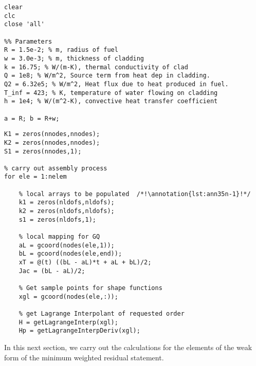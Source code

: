 \begin{lstlisting}[style=myMatlab,name=lec35n-ex]
clear
clc
close 'all'

%% Parameters
R = 1.5e-2; % m, radius of fuel
w = 3.0e-3; % m, thickness of cladding
k = 16.75; % W/(m-K), thermal conductivity of clad
Q = 1e8; % W/m^2, Source term from heat dep in cladding.
Q2 = 6.32e5; % W/m^2, Heat flux due to heat produced in fuel.
T_inf = 423; % K, temperature of water flowing on cladding
h = 1e4; % W/(m^2-K), convective heat transfer coefficient

a = R; b = R+w;
\end{lstlisting}

\begin{lstlisting}[style=myMatlab,name=lec35n-ex]
% initialize global arrays
K1 = zeros(nnodes,nnodes);
K2 = zeros(nnodes,nnodes);
S1 = zeros(nnodes,1);

% carry out assembly process
for ele = 1:nelem

    % local arrays to be populated  /*!\annotation{lst:ann35n-1}!*/
    k1 = zeros(nldofs,nldofs);
    k2 = zeros(nldofs,nldofs);
    s1 = zeros(nldofs,1);
    
    % local mapping for GQ
    aL = gcoord(nodes(ele,1));
    bL = gcoord(nodes(ele,end));
    xT = @(t) ((bL - aL)*t + aL + bL)/2;
    Jac = (bL - aL)/2;

    % Get sample points for shape functions
    xgl = gcoord(nodes(ele,:));
    
    % get Lagrange Interpolant of requested order
    H = getLagrangeInterp(xgl);
    Hp = getLagrangeInterpDeriv(xgl);
\end{lstlisting}

In this next section, we carry out the calculations for the elements of the weak form of the minimum weighted residual statement.

